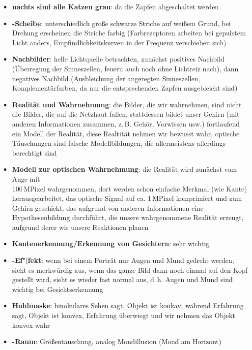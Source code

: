 \linie
\begin{itemize}
    \item
    \textbf{nachts sind alle Katzen grau}:
    da die Zapfen abgeschaltet werden

    \item
    \textbf{-Scheibe}:
    unterschiedlich große schwarze Striche auf weißem Grund, bei Drehung
    erscheinen die Striche farbig (Farbrezeptoren arbeiten bei gepulstem Licht
    anders, Empfindlichkeitskurven in der Frequenz verschieben sich)

    \item
    \textbf{Nachbilder}:
    helle Lichtquelle betrachten,
    zunächst positives Nachbild (Überregung der Sinneszellen, feuern auch noch
    ohne Lichtreiz nach), dann negatives Nachbild
    (Ausbleichung der angeregten Sinneszellen, Komplementärfarben, da nur
    die entsprechenden Zapfen ausgebleicht sind)
\end{itemize}
\linie
\begin{itemize}
    \item
    \textbf{Realität und Wahrnehmung}:
    die Bilder, die wir wahrnehmen, sind nicht die Bilder, die auf die
    Netzhaut fallen, stattdessen bildet unser Gehirn (mit anderen Informationen
    zusammen, z.\,B. Gehör, Vorwissen usw.) fortlaufend ein Modell der
    Realität, diese Realtität nehmen wir bewusst wahr,
    optische Täuschungen sind falsche Modellbildungen,
    die allermeistens allerdings berechtigt sind

    \item
    \textbf{Modell zur optischen Wahrnehmung}:
    die Realität wird zunächst vom Auge mit\\
    $100\,\text{MPixel}$ wahrgenommen,
    dort werden schon einfache Merkmal (wie Kante) herausgearbeitet,
    das optische Signal auf ca. $1\,\text{MPixel}$ komprimiert und zum
    Gehirn geschickt, das aufgrund von anderen Informationen eine
    Hypothesenbildung durchführt, die unsere wahrgenommene Realität
    erzeugt, aufgrund derer wir unsere Reaktionen planen

    \item
    \textbf{Kantenerkennung/Erkennung von Gesichtern}:
    sehr wichtig

    \item
    \textbf{-Ef"|fekt}:
    wenn bei einem Porträt nur Augen und Mund gedreht werden,
    sieht es merkwürdig aus, wenn das ganze Bild dann noch einmal
    auf den Kopf gestellt wird, sieht es wieder fast normal aus,
    d.\,h. Augen und Mund sind wichtig bei Gesichtserkennung

    \item
    \textbf{Hohlmaske}:
    binokulares Sehen sagt, Objekt ist konkav,
    während Erfahrung sagt, Objekt ist konvex,
    Erfahrung überwiegt und wir nehmen das Objekt konvex wahr

    \item
    \textbf{-Raum}:
    Größentäuschung, analog Mondillusion (Mond am Horizont)
\end{itemize}

